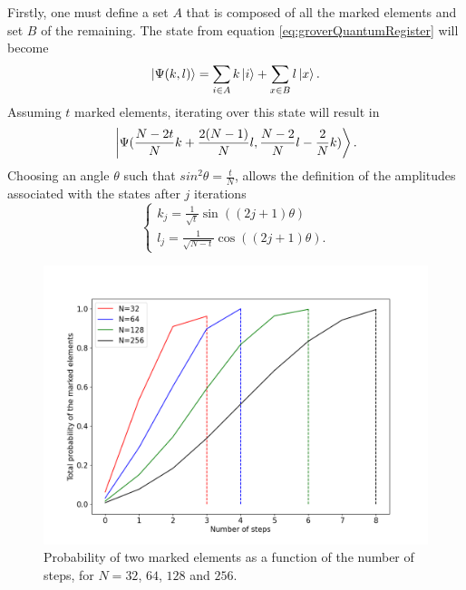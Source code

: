 \documentclass[../../dissertation.tex]{subfiles}
\begin{document}
Firstly, one must define a set $A$ that is composed of all the marked elements
and set $B$ of the remaining. The state from equation
\ref{eq:groverQuantumRegister} will become
\begin{equation}
	\ket{\Psi(k,l)} =\sum_{i\in A} k\ket{i} + \sum_{x \in B}l\ket{x}.
\end{equation}
Assuming $t$ marked elements, iterating over this state will result in
\begin{equation}
	\ket{\Psi(\frac{N-2t}{N}k + \frac{2(N-1)}{N}l, \frac{N-2}{N}l - \frac{2}{N}k)}.
\end{equation}
Choosing an angle $\theta$ such that $sin^2\theta=\frac{t}{N}$, allows the
definition of the amplitudes associated with the states after $j$ iterations 
\begin{equation}
	\begin{cases}
		k_{j} =\frac{1}{\sqrt{t}} \sin{((2j+1)\theta)} 
		\\l_{j} = \frac{1}{\sqrt{N-t}}\cos{((2j+1)\theta)}.
	\end{cases}\label{eq:groverKandJ2}
\end{equation}
\begin{figure}[h]
	\centering
	\includegraphics[scale=0.40]{img/Grover/GroverMultipleMarked3264128256}
	\caption{Probability of two marked elements as a function of the number of steps, for $N=32$, $64$, $128$ and $256$.} 
	\label{fig:groverMultipleMarked3264128256}
\end{figure}
\end{document}
